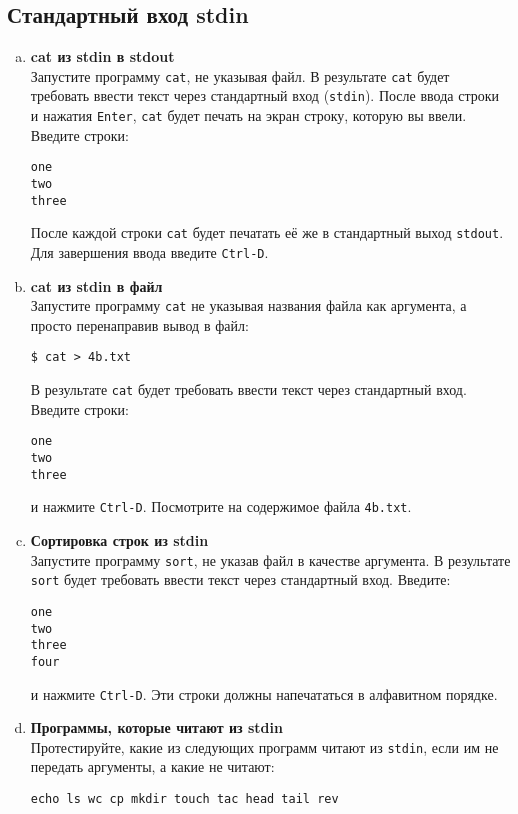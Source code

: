 \documentclass{article}
\begin{document}
\subsection{Стандартный вход stdin}
\begin{enumerate}[a.]
\item \textbf{cat из stdin в stdout}\\
Запустите программу \texttt{cat}, не указывая файл. В результате \texttt{cat} будет требовать ввести текст через стандартный вход (\texttt{stdin}). После ввода строки и нажатия \texttt{Enter}, \texttt{cat} будет печать на экран строку, которую вы ввели. Введите строки:
\begin{lstlisting}
one
two
three
\end{lstlisting}
После каждой строки \texttt{cat} будет печатать её же в стандартный выход \texttt{stdout}. Для завершения ввода введите \texttt{Ctrl-D}.

\item \textbf{cat из stdin в файл}\\
Запустите программу \texttt{cat} не указывая названия файла как аргумента, а просто перенаправив вывод в файл:
\begin{lstlisting}
$ cat > 4b.txt
\end{lstlisting}
В результате \texttt{cat} будет требовать ввести текст через стандартный вход. Введите строки:
\begin{lstlisting}
one
two
three
\end{lstlisting}
и нажмите \texttt{Ctrl-D}. Посмотрите на содержимое файла \texttt{4b.txt}.

\item \textbf{Сортировка строк из stdin}\\
Запустите программу \texttt{sort}, не указав файл в качестве аргумента. В результате \texttt{sort} будет требовать ввести текст через стандартный вход. Введите:
\begin{lstlisting}
one
two
three
four
\end{lstlisting}
и нажмите \texttt{Ctrl-D}. Эти строки должны напечататься в алфавитном порядке.

\item \textbf{Программы, которые читают из stdin}\\
Протестируйте, какие из следующих программ читают из \texttt{stdin}, если им не передать аргументы, а какие не читают:
\begin{lstlisting}
echo ls wc cp mkdir touch tac head tail rev
\end{lstlisting}


\end{enumerate}
\end{document}
